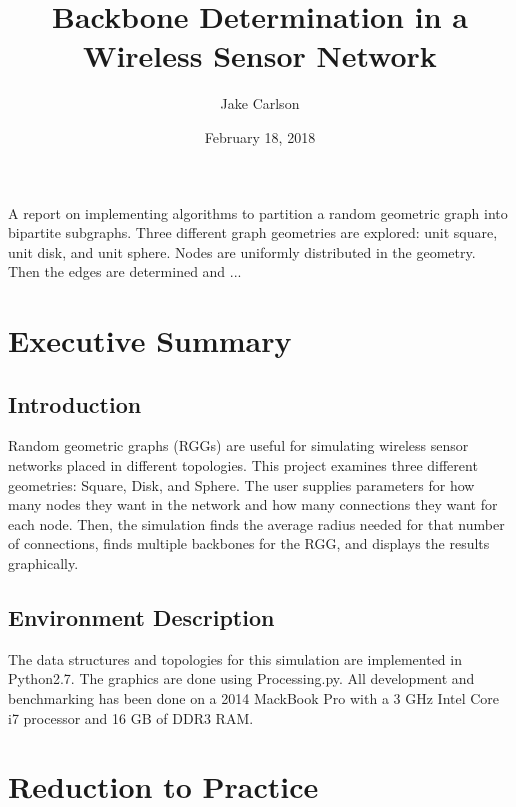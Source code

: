 \documentclass{article}
\begin{document}
\title{Backbone Determination in a Wireless Sensor Network}
\author{Jake Carlson}
\date{February 18, 2018}
\maketitle

\abstract
A report on implementing algorithms to partition a random geometric graph into bipartite subgraphs. Three different graph geometries are explored: unit square, unit disk, and unit sphere. Nodes are uniformly distributed in the geometry. Then the edges are determined and ...
\newpage

\tableofcontents
\newpage

\section{Executive Summary}

    \subsection{Introduction}
    Random geometric graphs (RGGs) are useful for simulating wireless sensor networks placed in different topologies. This project examines three different geometries: Square, Disk, and Sphere. The user supplies parameters for how many nodes they want in the network and how many connections they want for each node. Then, the simulation finds the average radius needed for that number of connections, finds multiple backbones for the RGG, and displays the results graphically.

    \subsection{Environment Description}
    The data structures and topologies for this simulation are implemented in Python2.7. The graphics are done using Processing.py. All development and benchmarking has been done on a 2014 MackBook Pro with a 3 GHz Intel Core i7 processor and 16 GB of DDR3 RAM.

\section{Reduction to Practice}
\end{document}

